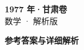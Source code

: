 \documentclass[zihao=-4, a4paper]{ctexart}
\begin{document}
\begin{center}
  {\Large\bfseries 1977 年·甘肃卷}\\[4pt]
  {\large 数学 · 解析版}
\end{center}
\medskip
{}

\clearpage
{}
\begin{center}{\Large\bfseries 参考答案与详细解析}\end{center}
\medskip

\end{document}
